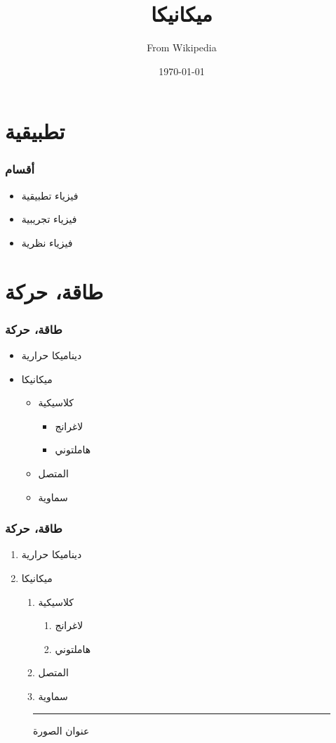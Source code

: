 \documentclass[hyperref=unicode]{beamer}
\title{ميكانيكا}
\author{From Wikipedia}
\date{\today}
\begin{document}
\begin{frame}
\titlepage
\end{frame}

\begin{frame}
\frametitle{\contentsname}
\tableofcontents
\end{frame}

\section{تطبيقية}

\begin{frame}
\frametitle{أقسام}
\begin{itemize}
\item فيزياء تطبيقية
\item فيزياء تجريبية
\item فيزياء نظرية
\end{itemize}



\end{frame}

\section{طاقة، حركة}

\begin{frame}
\frametitle{طاقة، حركة}
\begin{itemize}
\item ديناميكا حرارية
\item ميكانيكا
\begin{itemize}
\item كلاسيكية
\begin{itemize}
\item لاغرانج
\item هاملتوني
\end{itemize}
\item المتصل
\item سماوية
\end{itemize}
\end{itemize}
\end{frame}

\begin{frame}
\frametitle{طاقة، حركة}
\begin{enumerate}
\item ديناميكا حرارية
\item ميكانيكا
\begin{enumerate}
\item كلاسيكية
\begin{enumerate}
\item لاغرانج
\item هاملتوني
\end{enumerate}
\item المتصل
\item سماوية
\end{enumerate}
\end{enumerate}

\begin{figure}
\centering
\rule{2cm}{2cm}
\caption{عنوان الصورة}
\end{figure}


\end{frame}
\end{document}
